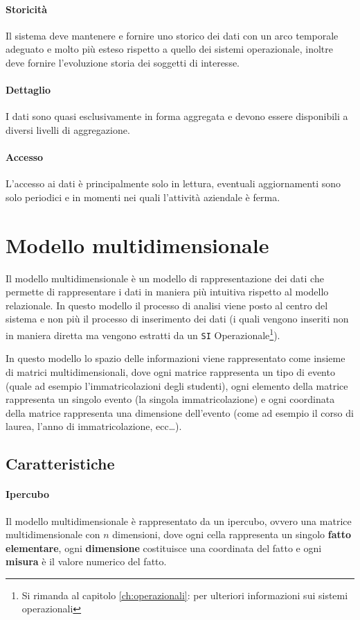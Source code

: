         \paragraph{Storicità} Il sistema deve mantenere e fornire uno storico dei dati con un arco temporale adeguato e molto più esteso rispetto a quello dei sistemi operazionale, inoltre deve fornire l'evoluzione storia dei soggetti di interesse.
        \paragraph{Dettaglio} I dati sono quasi esclusivamente in forma aggregata e devono essere disponibili a diversi livelli di aggregazione.
        \paragraph{Accesso} L'accesso ai dati è principalmente solo in lettura, eventuali aggiornamenti sono solo periodici e in momenti nei quali l'attività aziendale è ferma.
\section{Modello multidimensionale}
    Il modello multidimensionale è un modello di rappresentazione dei dati che permette di rappresentare i dati in maniera più intuitiva rispetto al modello relazionale. In questo modello il processo di analisi viene posto al centro del sistema e non più il processo di inserimento dei dati (i quali vengono inseriti non in maniera diretta ma vengono estratti da un \texttt{SI} Operazionale\footnote{Si rimanda al capitolo \ref{ch:operazionali}:  per ulteriori informazioni sui sistemi operazionali}).

    In questo modello lo spazio delle informazioni viene rappresentato come insieme di matrici multidimensionali, dove ogni matrice rappresenta un tipo di evento (quale ad esempio l'immatricolazioni degli studenti), ogni elemento della matrice rappresenta un singolo evento (la singola immatricolazione) e ogni coordinata della matrice rappresenta una dimensione dell'evento (come ad esempio il corso di laurea, l'anno di immatricolazione, ecc\dots).
    \subsection{Caratteristiche}
        \paragraph{Ipercubo} Il modello multidimensionale è rappresentato da un ipercubo, ovvero una matrice multidimensionale con $n$ dimensioni, dove ogni cella rappresenta un singolo \textbf{fatto elementare}, ogni \textbf{dimensione} costituisce una coordinata del fatto e ogni \textbf{misura} è il valore numerico del fatto.
